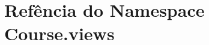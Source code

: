 \hypertarget{namespaceCourse_1_1views}{\section{Refência do Namespace Course.\-views}
\label{namespaceCourse_1_1views}
}
